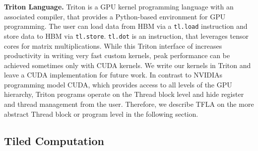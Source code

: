 \documentclass{article}
\begin{document}
\textbf{Triton Language.}
Triton is a GPU kernel programming language with an associated compiler, that provides a Python-based environment for GPU programming.
The user can load data from HBM via a \texttt{tl.load} instruction and store data to HBM via \texttt{tl.store}.
\texttt{tl.dot} is an instruction, that leverages tensor cores for matrix multiplications.
While this Triton interface of increases productivity in writing very fast custom kernels, peak performance can be achieved sometimes only with CUDA kernels.
We write our kernels in Triton and leave a CUDA implementation for future work.
In contrast to NVIDIAs programming model CUDA, which provides access to all levels of the GPU hierarchy, Triton programs operate on the Thread block level and hide register and thread management from the user.
Therefore, we describe TFLA on the more abstract Thread block or program level in the following section.

\newpage

    \subsection{Tiled Computation}
    \label{app:tiled_computation}
\end{document}
